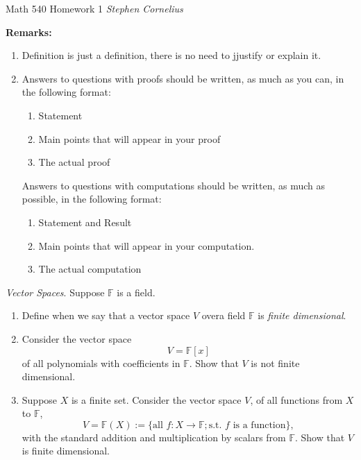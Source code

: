 \documentclass{article}
\begin{document}
\begin{center}
    Math 540
    \hfill Homework 1
    \hfill \textit{Stephen Cornelius}
\end{center}
\textbf{Remarks:} \\
\begin{enumerate}
    \item Definition is just a definition, there is no need to jjustify or explain it.
    \item Answers to questions with proofs should be written, as much as you can, in the following format: \\
    \begin{enumerate}
        \item Statement
        \item Main points that will appear in your proof
        \item The actual proof
    \end{enumerate}
    Answers to questions with computations should be written, as much as possible, in the following format:
    \begin{enumerate}
        \item Statement and Result
        \item Main points that will appear in your computation.
        \item The actual computation
    \end{enumerate}
\end{enumerate}
\begin{problem}
    \textit{Vector Spaces}. Suppose $\mathbb{F}$ is a field.
    \begin{enumerate}
        \item Define when we say that a vector space $V$ overa  field $\mathbb{F}$ is \textit{finite dimensional}.
        \item Consider the vector space
        \[
            V = \mathbb{F}[x]
        \]
        of all polynomials with coefficients in $\mathbb{F}$. Show that $V$ is not finite dimensional.
        \item Suppose $X$ is a finite set. Consider the vector space $V$, of all functions from $X$ to $\mathbb{F}$,
        \[
            V = \mathbb{F}(X):= \{\text{all }f: X \to \mathbb{F}; \text{s.t. $f$ is a function}\},
        \]
        with the standard addition and multiplication by scalars from $\mathbb{F}$. Show that $V$ is finite dimensional.
    \end{enumerate}
\end{problem}
\end{document}
